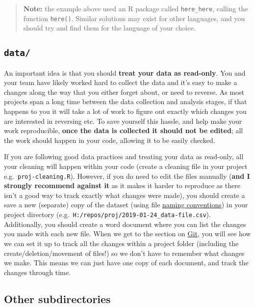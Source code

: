 \documentclass[]{book}
\begin{document}
\begin{quote}
\textbf{Note:} the example above used an R package called \texttt{here\_here}, calling the function \texttt{here()}. Similar solutions may exist for other languages, and you should try and find them for the language of your choice.
\end{quote}

\hypertarget{data}{%
\subsection{\texorpdfstring{\texttt{data/}}{data/}}\label{data}}

An important idea is that you should \textbf{treat your data as read-only}. You and your team have likely worked hard to collect the data and it's easy to make a changes along the way that you either forget about, or need to reverse. As most projects span a long time between the data collection and analysis stages, if that happens to you it will take a lot of work to figure out exactly which changes you are interested in reversing etc. To save yourself this hassle, and help make your work reproducible, \textbf{once the data is collected it should not be edited}; all the work should happen in your code, allowing it to be easily checked.

If you are following good data practices and treating your data as read-only, all your cleaning will happen within your code (create a cleaning file in your project e.g.~\texttt{proj-cleaning.R}). However, if you do need to edit the files manually (\textbf{and I strongly recommend against it} as it makes it harder to reproduce as there isn't a good way to track exactly what changes were made), you should create a save a new (separate) copy of the dataset (using file \protect\hyperlink{how-to-name-files}{naming conventions}) in your project directory (e.g.~\texttt{H:/repos/proj/2019-01-24\_data-file.csv}). Additionally, you should create a word document where you can list the changes you made with each new file. When we get to the section on \protect\hyperlink{git}{Git}, you will see how we can set it up to track all the changes within a project folder (including the create/deletion/movement of files!) so we don't have to remember what changes we make. This means we can just have one copy of each document, and track the changes through time.

\hypertarget{other-subdirectories}{%
\subsection{Other subdirectories}\label{other-subdirectories}}
\end{document}
